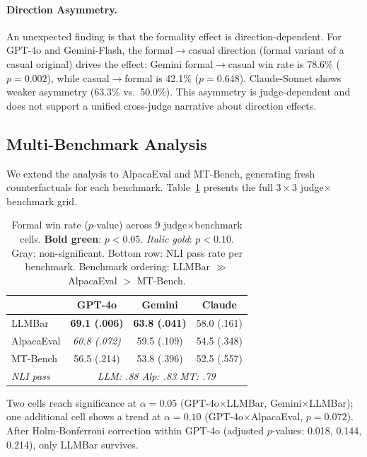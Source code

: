 \documentclass[11pt,a4paper]{article}
\newcommand{\sig}[1]{\textcolor{siggreen}{\textbf{#1}}}
\newcommand{\trend}[1]{\textcolor{trendyellow}{\textit{#1}}}
\begin{document}
\paragraph{Direction Asymmetry.}
An unexpected finding is that the formality effect is direction-dependent.
For GPT-4o and Gemini-Flash, the formal$\rightarrow$casual direction (formal variant of a casual original) drives the effect: Gemini formal$\rightarrow$casual win rate is 78.6\% ($p{=}0.002$), while casual$\rightarrow$formal is 42.1\% ($p{=}0.648$).
Claude-Sonnet shows weaker asymmetry (63.3\% vs.\ 50.0\%).
This asymmetry is judge-dependent and does not support a unified cross-judge narrative about direction effects.

\subsection{Multi-Benchmark Analysis}
\label{sec:exp_multibench}

We extend the analysis to AlpacaEval and MT-Bench, generating fresh counterfactuals for each benchmark.
Table~\ref{tab:fullgrid} presents the full $3{\times}3$ judge$\times$benchmark grid.

\begin{table}[t]
\centering
\small
\setlength{\tabcolsep}{3pt}
\begin{tabular}{@{}lccc@{}}
\toprule
& \textbf{GPT-4o} & \textbf{Gemini} & \textbf{Claude} \\
\midrule
LLMBar & \sig{69.1 (.006)} & \sig{63.8 (.041)} & 58.0 (.161) \\
AlpacaEval & \trend{60.8 (.072)} & 59.5 (.109) & 54.5 (.348) \\
MT-Bench & 56.5 (.214) & 53.8 (.396) & 52.5 (.557) \\
\midrule
\textit{NLI pass} & \multicolumn{3}{c}{\textit{LLM: .88 \quad Alp: .83 \quad MT: .79}} \\
\bottomrule
\end{tabular}
\caption{Formal win rate ($p$-value) across 9 judge$\times$benchmark cells. \textbf{Bold green}: $p{<}0.05$. \textit{Italic gold}: $p{<}0.10$. Gray: non-significant. Bottom row: NLI pass rate per benchmark. Benchmark ordering: LLMBar $\gg$ AlpacaEval $>$ MT-Bench.}
\label{tab:fullgrid}
\end{table}

Two cells reach significance at $\alpha{=}0.05$ (GPT-4o$\times$LLMBar, Gemini$\times$LLMBar); one additional cell shows a trend at $\alpha{=}0.10$ (GPT-4o$\times$AlpacaEval, $p{=}0.072$).
After Holm-Bonferroni correction within GPT-4o (adjusted $p$-values: 0.018, 0.144, 0.214), only LLMBar survives.
\end{document}
